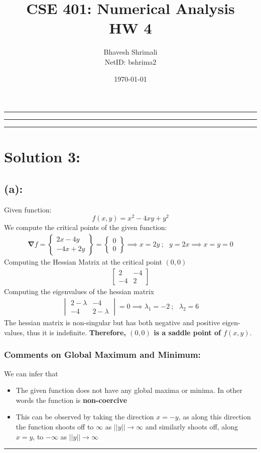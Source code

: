 
\title{\bf CSE 401: Numerical Analysis \\ HW 4}
\author{Bhavesh Shrimali \\ NetID: bshrima2}
\date{\today}
\titlespacing*{\title}{-2ex}{*-2ex}{-2ex}

\maketitle \hrule \hrule \hrule
\section*{Solution 3:}
\subsection*{(a):}
Given function:
\[
f(x,y)
=
x^2 - 4xy + y^2
\]
We compute the critical points of the given function: 
\begin{align*}
\bm\nabla f
=
\begin{Bmatrix}
2x - 4y \\
-4x + 2y
\end{Bmatrix}
=
\begin{Bmatrix}
0\\0
\end{Bmatrix}\implies x = 2y\ ; \ \ \ y = 2x \implies x=y=0
\end{align*}
Computing the Hessian Matrix at the critical point $(0,0)$
\begin{align*}
\begin{bmatrix}
2 & -4 \\
-4 & 2
\end{bmatrix}
\end{align*}
Computing the eigenvalues of the hessian matrix
\begin{align*}
\begin{vmatrix}
2-\lambda & -4 \\
-4 & 2-\lambda
\end{vmatrix} = 0 \implies \lambda_1 = -2\ ; \ \ \ \lambda_2 = 6
\end{align*}
The hessian matrix is non-singular but has both negative and positive eigen-values, thus it is indefinite. {\bf Therefore,  $(0,0)$ is a saddle point of $f(x,y)$}. 
\subsubsection*{Comments on Global Maximum and Minimum: }
We can infer that
\begin{itemize}
\item The given function does not have any global maxima or minima. In other words the function is {\bf non-coercive}
\item This can be observed by taking the direction $x=-y$, as along this direction the function shoots off to $\infty$ as $||y||\rightarrow \infty$ and similarly shoots off, along $x=y$, to $-\infty$ as $||y||\rightarrow \infty$ 
\end{itemize}\hrule 
